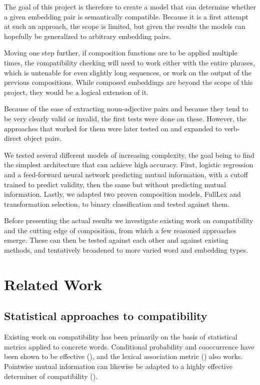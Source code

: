 \documentclass[a4paper, 12pt]{scrartcl}
\begin{document}
The goal of this project is therefore to create a model that can determine whether a given embedding pair is semantically compatible. Because it is a first attempt at such an approach, the scope is limited, but given the results the models can hopefully be generalized to arbitrary embedding pairs.

Moving one step further, if composition functions are to be applied multiple times, the compatibility checking will need to work either with the entire phrases, which is untenable for even slightly long sequences, or work on the output of the previous compositions. While composed embeddings are beyond the scope of this project, they would be a logical extension of it.

Because of the ease of extracting noun-adjective pairs and because they tend to be very clearly valid or invalid, the first tests were done on these. However, the approaches that worked for them were later tested on and expanded to verb-direct object pairs.

We tested several different models of increasing complexity, the goal being to find the simplest architecture that can achieve high accuracy. First, logistic regression and a feed-forward neural network predicting mutual information, with a cutoff trained to predict validity, then the same but without predicting mutual information. Lastly, we adapted two proven composition models, FullLex and transformation selection, to binary classification and tested against them.

Before presenting the actual results we investigate existing work on compatibility and the cutting edge of composition, from which a few reasoned approaches emerge. These can then be tested against each other and against existing methods, and tentatively broadened to more varied word and embedding types.


\section{Related Work}

\subsection{Statistical approaches to compatibility}

Existing work on compatibility has been primarily on the basis of statistical metrics applied to concrete words. Conditional probability and cooccurrence have been shown to be effective (\cite{Volk}), and the lexical association metric (\cite{HindleRooth}) also works. Pointwise mutual information can likewise be adapted to a highly effective determiner of compatibility (\cite{vanNoord}).
\end{document}
